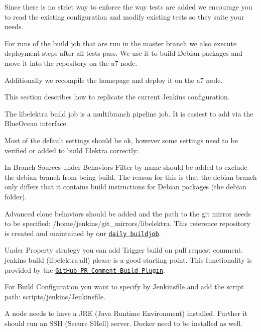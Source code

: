 Since there is no strict way to enforce the way tests are added we encourage you to read the existing configuration and modify existing tests so they suite your needs.

For runs of the build job that are run in the master branch we also execute deployment steps after all tests pass. We use it to build Debian packages and move it into the repository on the a7 node.

Additionally we recompile the homepage and deploy it on the a7 node.

This section describes how to replicate the current Jenkins configuration.

The {\ttfamily libelektra} build job is a multibranch pipeline job. It is easiest to add via the Blue\+Ocean interface.

Most of the default settings should be ok, however some settings need to be verified or added to build Elektra correctly\+:


\begin{DoxyItemize}
\item In Branch Sources under Behaviors {\ttfamily Filter by name} should be added to exclude the {\ttfamily debian} branch from being build. The reason for this is that the {\ttfamily debian} branch only differs that it contains build instructions for Debian packages (the {\ttfamily debian} folder).
\item {\ttfamily Advanced clone behaviors} should be added and the path to the git mirror needs to be specified\+: {\ttfamily /home/jenkins/git\+\_\+mirrors/libelektra}. This reference repository is created and maintained by our \href{https://build.libelektra.org/job/libelektra-daily/}{\tt daily buildjob}.
\item Under Property strategy you can add {\ttfamily Trigger build on pull request comment}. {\ttfamily jenkins build (libelektra$\vert$all) please} is a good starting point. This functionality is provided by the \href{https://wiki.jenkins-ci.org/display/JENKINS/GitHub+PR+Comment+Build+Plugin}{\tt Git\+Hub PR Comment Build Plugin}.
\item For Build Configuration you want to specify {\ttfamily by Jenkinsfile} and add the script path\+: {\ttfamily scripts/jenkins/\+Jenkinsfile}.
\end{DoxyItemize}

A node needs to have a J\+RE (Java Runtime Environment) installed. Further it should run an S\+SH (Secure S\+Hell) server. Docker need to be installed as well.

